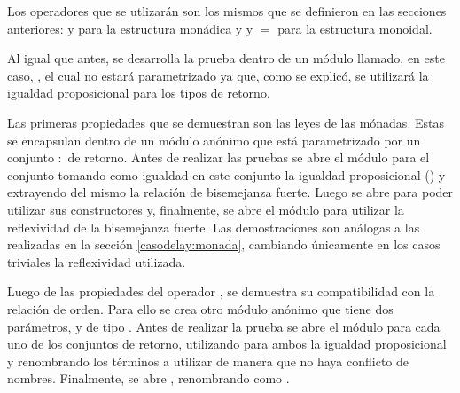 
Los operadores que se utlizarán son los mismos que se definieron en las secciones anteriores:  y  para la estructura monádica y  y  $=$  para la estructura monoidal. 

Al igual que antes, se desarrolla la prueba dentro de un módulo llamado, en este caso, , el cual no estará parametrizado ya que, como se explicó, se utilizará la igualdad proposicional para los tipos de retorno. 

\begin{AgdaAlign}

Las primeras propiedades que se demuestran son las leyes de las mónadas. Estas se encapsulan dentro de un módulo anónimo que está parametrizado por un conjunto  $:$  de retorno. Antes de realizar las pruebas se abre el módulo   para el conjunto  tomando como igualdad en este conjunto la igualdad proposicional (\AgdaFunction{\_$\equiv$\_}) y extrayendo del mismo la relación de bisemejanza fuerte. Luego se abre  para poder utilizar sus constructores y, finalmente, se abre el módulo  para utilizar la reflexividad de la bisemejanza fuerte. Las demostraciones son análogas a las realizadas en la sección \ref{casodelay:monada}, cambiando únicamente en los casos triviales la reflexividad utilizada. 


Luego de las propiedades del operador , se demuestra su compatibilidad con la relación de orden. Para ello se crea otro módulo anónimo que tiene dos parámetros,  y  de tipo . Antes de realizar la prueba se abre el módulo  para cada uno de los conjuntos de retorno, utilizando para ambos la igualdad proposicional y renombrando los términos a utilizar de manera que no haya conflicto de nombres. Finalmente, se abre , renombrando  como . 



\end{AgdaAlign}

